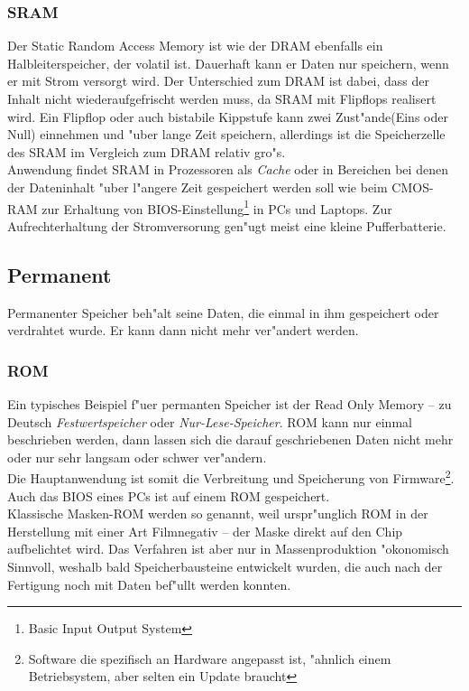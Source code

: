 				\subsubsection{SRAM}
				\label{ch:Technisch:sec:Elektronische Speicherung:sub:Fl"uchtig:subsub:SRAM}
				
				Der \glqq Static Random Access Memory\grqq{} ist wie der DRAM ebenfalls ein Halbleiterspeicher, der volatil ist. Dauerhaft kann er Daten nur speichern, wenn er mit Strom versorgt wird. Der Unterschied zum DRAM ist dabei, dass der Inhalt nicht wiederaufgefrischt werden muss, da SRAM mit Flipflops realisert wird. Ein Flipflop oder auch bistabile Kippstufe kann zwei Zust"ande(Eins oder Null) einnehmen und "uber lange Zeit speichern, allerdings ist die Speicherzelle des SRAM im Vergleich zum DRAM relativ gro"s.
				\\
				Anwendung findet SRAM in Prozessoren als \textit{Cache} oder in Bereichen bei denen der Dateninhalt "uber l"angere Zeit gespeichert werden soll wie beim CMOS-RAM zur Erhaltung von BIOS-Einstellung\footnote[5]{Basic Input Output System} in PCs und Laptops. Zur Aufrechterhaltung der Stromversorung gen"ugt meist eine kleine Pufferbatterie.
        
        \subsection{Permanent}
        \label{ch:Technisch:sec:Elektronische Speicherung:sub:Permanent}
        
            Permanenter Speicher beh"alt seine Daten, die einmal in ihm gespeichert oder verdrahtet wurde. Er kann dann nicht mehr ver"andert werden.
			
				\subsubsection{ROM}
				\label{ch:Technisch:sec:Elektronische Speicherung:sub:Fl"uchtig:subsub:ROM}
				
				Ein typisches Beispiel f"uer permanten Speicher ist der \glqq Read Only Memory \grqq{} – zu Deutsch \textit{Festwertspeicher} oder \textit{Nur-Lese-Speicher}. ROM kann nur einmal beschrieben werden, dann lassen sich die darauf geschriebenen Daten nicht mehr oder nur sehr langsam oder schwer ver"andern. 
				\\
				Die Hauptanwendung ist somit die Verbreitung und Speicherung von Firmware\footnote[6]{Software die spezifisch an Hardware angepasst ist, "ahnlich einem Betriebsystem, aber selten ein Update braucht}. Auch das BIOS eines PCs ist auf einem ROM gespeichert.
				\\
				Klassische Masken-ROM werden so genannt, weil urspr"unglich ROM in der Herstellung mit einer Art Filmnegativ – der \glqq Maske\grqq{} direkt auf den Chip aufbelichtet wird. Das Verfahren ist aber nur in Massenproduktion "okonomisch Sinnvoll, weshalb bald Speicherbausteine entwickelt wurden, die auch nach der Fertigung noch mit Daten bef"ullt werden konnten.
				

